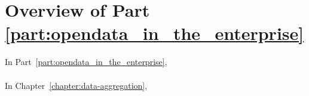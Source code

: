 \chapter*{Overview of Part \ref{part:opendata_in_the_enterprise}}

In Part~\ref{part:opendata_in_the_enterprise},
\\
\\
In Chapter~\ref{chapter:data-aggregation},